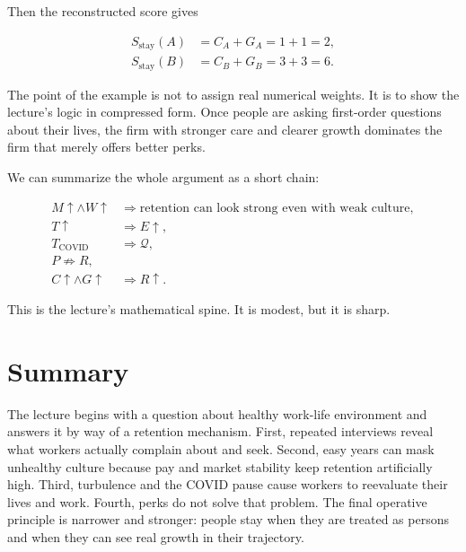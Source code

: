 Then the reconstructed score gives

\begin{align}
S_{\text{stay}}(A) &= C_A + G_A = 1+1 = 2,\\
S_{\text{stay}}(B) &= C_B + G_B = 3+3 = 6.
\end{align}

The point of the example is not to assign real numerical weights. It is to show the lecture's logic in compressed form. Once people are asking first-order questions about their lives, the firm with stronger care and clearer growth dominates the firm that merely offers better perks.

We can summarize the whole argument as a short chain:

\begin{align}
M \uparrow \land W \uparrow &\Rightarrow \text{retention can look strong even with weak culture},\\
T \uparrow &\Rightarrow E \uparrow,\\
T_{\text{COVID}} &\Rightarrow \mathcal{Q},\\
P \not\Rightarrow R,\\
C \uparrow \land G \uparrow &\Rightarrow R \uparrow .
\end{align}

This is the lecture's mathematical spine. It is modest, but it is sharp.

\section{Summary}

The lecture begins with a question about healthy work-life environment and answers it by way of a retention mechanism. First, repeated interviews reveal what workers actually complain about and seek. Second, easy years can mask unhealthy culture because pay and market stability keep retention artificially high. Third, turbulence and the COVID pause cause workers to reevaluate their lives and work. Fourth, perks do not solve that problem. The final operative principle is narrower and stronger: people stay when they are treated as persons and when they can see real growth in their trajectory.